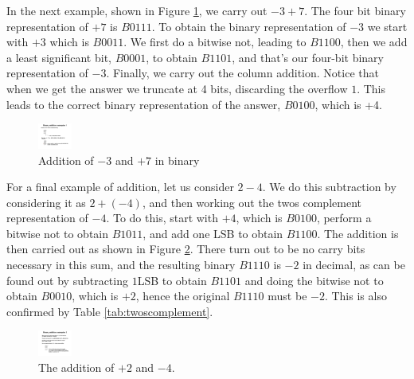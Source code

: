 \documentclass[../physical_computing.tex]{subfiles}
\begin{document}
In the next example, shown in Figure \ref{fig:addition_example_2}, we carry out $-3+7$. The four bit binary representation of $+7$ is $B0111$. To obtain the binary representation of $-3$ we start with $+3$ which is $B0011$. We first do a bitwise not, leading to $B1100$, then we add a least significant bit, $B0001$, to obtain $B1101$, and that's our four-bit binary representation of $-3$. Finally, we carry out the column addition. Notice that when we get the answer we truncate at 4 bits, discarding the overflow $1$. This leads to the correct binary representation of the answer, $B0100$, which is +4.
\begin{figure}[h!]
    \centering
    \includegraphics[width=0.1\textwidth]{figures/addition_example_2.pdf}
    \caption{Addition of $-3$ and $+7$ in binary}
    \label{fig:addition_example_2}
\end{figure}
For a final example of addition, let us consider $2-4$. We do this subtraction by considering it as $2+(-4)$, and then working out the twos complement representation of $-4$. To do this, start with $+4$, which is $B0100$, perform a bitwise not to obtain $B1011$, and add one LSB to obtain $B1100$. The addition is then carried out as shown in Figure \ref{fig:addition_example_3}. There turn out to be no carry bits necessary in this sum, and the resulting binary $B1110$ is $-2$ in decimal, as can be found out by subtracting $1$LSB to obtain $B1101$ and doing the bitwise not to obtain $B0010$, which is $+2$, hence the original $B1110$ must be $-2$. This is also confirmed by Table \ref{tab:twoscomplement}.
\begin{figure}[h!]
    \centering
    \includegraphics[width=0.1\textwidth]{figures/addition_example_3.pdf}
    \caption{The addition of $+2$ and $-4$.}
    \label{fig:addition_example_3}
\end{figure}
\end{document}
